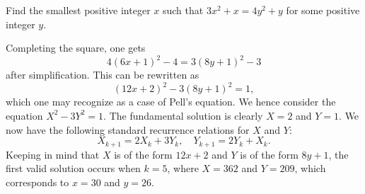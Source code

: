 \begin{question}[30]\label{A::2022-O-1-21}
    Find the smallest positive integer $x$ such that $3x^2 + x = 4y^2 + y$ for some positive integer $y$.
\end{question}
\begin{solution*}
    Completing the square, one gets \[4(6x+1)^2 - 4 = 3(8y+1)^2 - 3\] after simplification. This can be rewritten as \[(12x+2)^2 - 3(8y+1)^2 = 1,\] which one may recognize as a case of Pell's equation. We hence consider the equation $X^2 - 3Y^2 = 1$. The fundamental solution is clearly $X = 2$ and $Y = 1$. We now have the following standard recurrence relations for $X$ and $Y$: \[X_{k+1} = 2X_k + 3Y_k, \quad Y_{k+1} = 2Y_k + X_k.\] Keeping in mind that $X$ is of the form $12x + 2$ and $Y$ is of the form $8y +1$, the first valid solution occurs when $k = 5$, where $X = 362$ and $Y = 209$, which corresponds to $x = 30$ and $y = 26$.
\end{solution*}

